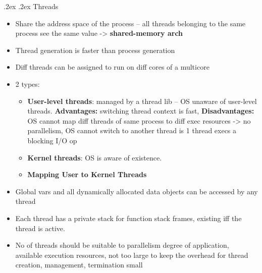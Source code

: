\documentclass[10pt,landscape,a4paper]{article}
\makeatletter
\renewcommand{\subsubsection}{\@startsection{subsubsection}{1}{0mm}%
  {.2ex}%
  {.2ex}%
{\rmfamily\bfseries}}
\makeatother
\begin{document}
\begin{multicols*}{4}
  \subsubsection{Threads}
  \begin{itemize}
    \item Share the address space of the process -- all threads belonging to the same process see the same value -> \textbf{shared-memory arch}
    \item Thread generation is faster than process generation
    \item Diff threads can be assigned to run on diff cores of a multicore
    \item 2 types:
          \begin{itemize}
            \item \textbf{User-level threads}: managed by a thread lib -- OS unaware of user-level threads. \textbf{Advantages:} switching thread context is fast, \textbf{Disadvantages:} OS cannot map diff threads of same process to diff exec resources -> no parallelism, OS cannot switch to another thread is 1 thread execs a blocking I/O op
            \item \textbf{Kernel threads}: OS is aware of existence.
            \item \textbf{Mapping User to Kernel Threads}
          \end{itemize}
    \item Global vars and all dynamically allocated data objects can be accessed by any thread
    \item Each thread has a private stack for function stack frames, existing iff the thread is active.
    \item No of threads should be suitable to parallelism degree of application, available execution resources, not too large to keep the overhead for thread creation, management, termination small
  \end{itemize}

\end{multicols*}
\end{document}
